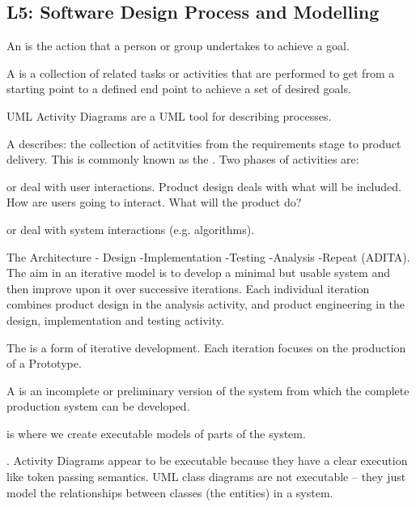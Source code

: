 \subsection{L5: Software Design Process and Modelling}
\begin{compactitem}
\item An  is the action that a person or group undertakes to achieve a goal. 
\item A 
is a collection of
related tasks
or
activities
that are
performed to get from a
starting point
to a
defined end point
to achieve
a set of desired goals.
\item UML Activity Diagrams
are a UML tool for describing
processes.

\item A  describes:
the collection of actitvities from the requirements stage to product delivery. This is commonly known as the  . Two phases of activities are:
\begin{compactitem}
\item {} or  deal with user interactions. Product design deals with what will be included. How are users going to interact. What will the product do?
\item {} or  deal with system interactions (e.g. algorithms).
\end{compactitem}

\item The  Architecture - Design -Implementation -Testing -Analysis -Repeat (ADITA).
The aim in an iterative
model is to develop a
minimal but
usable
system and then improve
upon it over successive
iterations. 
Each individual
iteration
combines product design in the analysis
activity, and product engineering in the design, implementation
and testing activity.

\item The  is a form of
iterative development. Each iteration focuses on the
production of a
Prototype.
\begin{compactitem}
\item A 
is an incomplete or preliminary version of
the system from which the complete production system
can be developed. 
\item {} is where we create executable models of parts of the system.
\end{compactitem}
\item {}.
Activity Diagrams
appear to be executable because they have
a clear execution like
token passing
semantics. 
UML class diagrams are not executable – they just model the
relationships between classes (the entities) in a system.


\end{compactitem}
